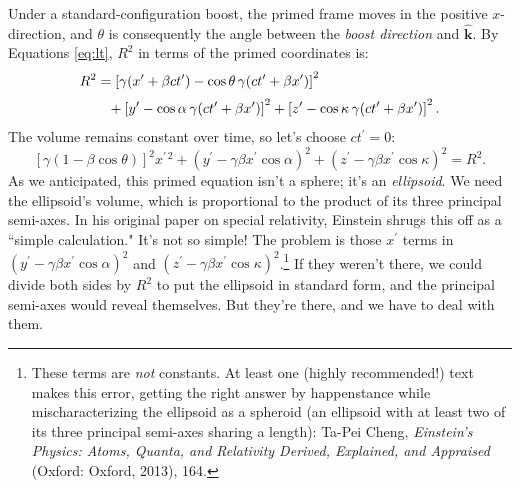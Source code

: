 \documentclass[12pt]{article}
\renewcommand{\vv}[1]{\mathbf{#1}}
\begin{document}
Under a standard-configuration boost, the primed frame moves in the positive $x$-direction, and $\theta$ is consequently the angle between the \emph{boost direction} and $\vv{\hat{k}}$. By Equations \ref{eq:lt}, $R^2$ in terms of the primed coordinates is:
\begin{equation*}
\begin{aligned}
&R^2 = \left[ \gamma (x^\prime + \beta ct^\prime )  - \cos{\theta} \, \gamma (ct^\prime + \beta x^\prime) \right]^2 \\[2pt]
& \qquad + \left[ y^\prime - \cos{\alpha} \, \mkern.5mu \gamma (ct^\prime + \beta x^\prime) \right]^2 + \left[ z^\prime - \cos{\kappa} \, \mkern.5mu \gamma (ct^\prime + \beta x^\prime) \right]^2.
\end{aligned}
\end{equation*}
The volume remains constant over time, so let's choose $ct^\prime = 0$:
\begin{equation}\label{eq:ell}
\left[ \gamma ( 1 - \beta \cos{\theta} ) \right]^2 x^{\prime \, 2} + \left( y^\prime -  \gamma \beta x^\prime \cos{\alpha} \right)^2 + \left( z^\prime - \gamma \beta x^\prime \cos{\kappa} \right)^2 = R^2 .
\end{equation}
As we anticipated, this primed equation isn't a sphere; it's an \emph{ellipsoid}. We need the ellipsoid's volume, which is proportional to the product of its three principal semi-axes. In his original paper on special relativity, Einstein shrugs this off as a ``simple calculation." It's not so simple! The problem is those $x^\prime$ terms in $(y^\prime - \gamma \beta x^\prime \cos \alpha)^2$ and $(z^\prime - \gamma \beta x^\prime \cos \kappa)^2$.\footnote{\label{fn:sph}These terms are \emph{not} constants. At least one (highly recommended!) text makes this error, getting the right answer by happenstance while mischaracterizing the ellipsoid as a spheroid (an ellipsoid with at least two of its three principal semi-axes sharing a length): Ta-Pei Cheng, \emph{Einstein's Physics: Atoms, Quanta, and Relativity Derived, Explained, and Appraised} (Oxford: Oxford, 2013), 164.} If they weren't there, we could divide both sides by $R^2$ to put the ellipsoid in standard form, and the principal semi-axes would reveal themselves. But they're there, and we have to deal with them.
\end{document}
